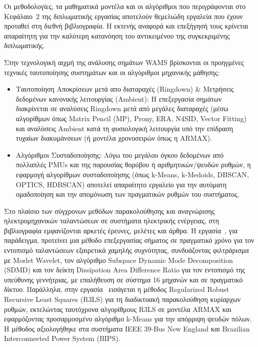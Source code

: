 Οι μεθοδολογίες, τα μαθηματικά μοντέλα και οι αλγόριθμοι που περιγράφονται στο Κεφάλαιο~2 της διπλωματικής εργασίας αποτελούν θεμελιώδη εργαλεία που έχουν προταθεί στη διεθνή βιβλιογραφία. Η εκτενής αναφορά και επεξήγησή τους κρίνεται απαραίτητη για την καλύτερη κατανόηση του αντικειμένου της συγκεκριμένης διπλωματικής.

Στην τεχνολογική αιχμή της ανάλυσης σημάτων WAMS βρίσκονται οι προηγμένες τεχνικές ταυτοποίησης συστημάτων και οι αλγόριθμοι μηχανικής μάθησης:

\begin{itemize}
    \item Ταυτοποίηση Αποκρίσεων μετά απο διαταραχές (Ringdown) \& Μετρήσεις δεδομένων κανονικής λειτουργίας (Ambient): Η επεξεργασία σημάτων διακρίνεται σε αναλύσεις Ringdown μετά από μεγάλες διαταραχές (μέσω αλγορίθμων όπως \textenglish{Matrix Pencil (MP)}, Prony, ERA, N4SID, Vector Fitting) και αναλύσεις Ambient κατά τη φυσιολογική λειτουργία υπό την επίδραση τυχαίων διακυμάνσεων (ή μοντέλα χρονοσειρών όπως η \textenglish{ARMAX}).

    \item Αλγόριθμοι Συσταδοποίησης: Λόγω του μεγάλου όγκου δεδομένων από πολλαπλές PMUs και της παρουσίας θορύβου ή αριθμητικών/ψευδών ρυθμών, η εφαρμογή αλγορίθμων συσταδοποίησης (όπως k-Means, k-Medoids, DBSCAN, OPTICS, HDBSCAN) αποτελεί απαραίτητο εργαλείο για την αυτόματη ομαδοποίηση και την απομόνωση των πραγματικών ρυθμών του συστήματος.

\end{itemize}

Στο πλαίσιο των σύγχρονων μεθόδων παρακολούθησης και αναγνώρισης ηλεκτρομηχανικών ταλαντώσεων σε συστήματα ηλεκτρικής ενέργειας, στη βιβλιογραφία εμφανίζονται αρκετές έρευνες, μελέτες και άρθρα. Η εργασία~\cite{cai2024ambient}, για παράδειγμα, προτείνει μια μέθοδο επεξεργασίας σήματος σε πραγματικό χρόνο για τον εντοπισμό ταλαντώσεων εξαιρετικά χαμηλής συχνότητας, συνδυάζοντας φιλτράρισμα με \textenglish{Morlet Wavelet}, τον αλγόριθμο \textenglish{Subspace Dynamic Mode Decomposition} (\textenglish{SDMD}) και τον δείκτη \textenglish{Dissipation Area Difference Ratio} για τον εντοπισμό της υπεύθυνης γεννήτριας, με επαλήθευση σε σύστημα 16 μηχανών και σε πραγματικό δίκτυο. Παράλληλα, στην εργασία~\cite{schumacher2022clusteredr3ls} εισάγεται η μέθοδος \textenglish{Regularized Robust Recursive Least Squares (R3LS)} για τη διαδικτυακή παρακολούθηση κυρίαρχων ρυθμών, εκτελώντας ταυτόχρονα αλγορίθμους \textenglish{R3LS} σε μοντέλα \textenglish{ARMAX} και εφαρμόζοντας προσαρμοσμένο αλγόριθμο \textenglish{k-Means} για την απόρριψη ψευδών πόλων. Η μέθοδος αξιολογήθηκε στα συστήματα \textenglish{IEEE 39-Bus New England} και \textenglish{Brazilian Interconnected Power System} (\textenglish{BIPS}).

